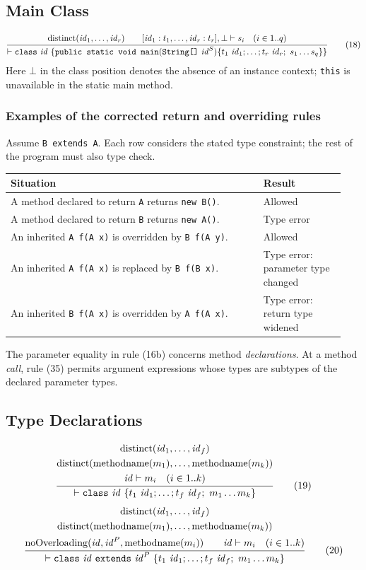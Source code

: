 \documentclass[11pt,a4paper]{article}
\newcommand{\kw}[1]{\text{\texttt{#1}}}
\newcommand{\mn}{\operatorname{methodname}}
\newcommand{\dist}{\operatorname{distinct}}
\newcommand{\noov}{\operatorname{noOverloading}}
\newcommand{\id}{\mathit{id}}
\newcommand{\ruleeq}[3]{\begin{equation}\frac{\begin{gathered}#2\end{gathered}}{\begin{gathered}#3\end{gathered}}\tag{#1}\end{equation}}
\begin{document}
\subsection{Main Class}
\begingroup\small
\ruleeq{18}{\dist(\id_1,\ldots,\id_r)\qquad
[\id_1:t_1,\ldots,\id_r:t_r],\bot\vdash s_i\quad(i\in1..q)}
{\vdash\kw{class}\ \id\ \{\kw{public\ static\ void\ main}(\kw{String[]}\ \id^S)\{t_1\ \id_1;\ldots;t_r\ \id_r;\ s_1\ldots s_q\}\}}
\endgroup
Here $\bot$ in the class position denotes the absence of an instance context;
\texttt{this} is unavailable in the static main method.

\subsubsection*{Examples of the corrected return and overriding rules}
Assume \texttt{B extends A}. Each row considers the stated type constraint;
the rest of the program must also type check.
\begin{center}\small
\begin{tabular}{@{}p{0.71\linewidth}p{0.23\linewidth}@{}}
\toprule
Situation & Result\\\midrule
A method declared to return \texttt{A} returns \texttt{new B()}. & Allowed\\[5pt]
A method declared to return \texttt{B} returns \texttt{new A()}. & Type error\\[5pt]
An inherited \texttt{A f(A x)} is overridden by \texttt{B f(A y)}. & Allowed\\[5pt]
An inherited \texttt{A f(A x)} is replaced by \texttt{B f(B x)}. & Type error: parameter type changed\\[5pt]
An inherited \texttt{B f(A x)} is overridden by \texttt{A f(A x)}. & Type error: return type widened\\
\bottomrule
\end{tabular}\end{center}
The parameter equality in rule (16b) concerns method \emph{declarations}.
At a method \emph{call}, rule (35) permits argument expressions whose types
are subtypes of the declared parameter types.

\newpage
\subsection{Type Declarations}
\ruleeq{19}{\dist(\id_1,\ldots,\id_f)\\
\dist(\mn(m_1),\ldots,\mn(m_k))\\
\id\vdash m_i\quad(i\in1..k)}
{\vdash\kw{class}\ \id\ \{t_1\ \id_1;\ldots;t_f\ \id_f;\ m_1\ldots m_k\}}
\ruleeq{20}{\dist(\id_1,\ldots,\id_f)\\
\dist(\mn(m_1),\ldots,\mn(m_k))\\
\noov(\id,\id^P,\mn(m_i))\qquad\id\vdash m_i\quad(i\in1..k)}
{\vdash\kw{class}\ \id\ \kw{extends}\ \id^P\ \{t_1\ \id_1;\ldots;t_f\ \id_f;\ m_1\ldots m_k\}}
\end{document}
